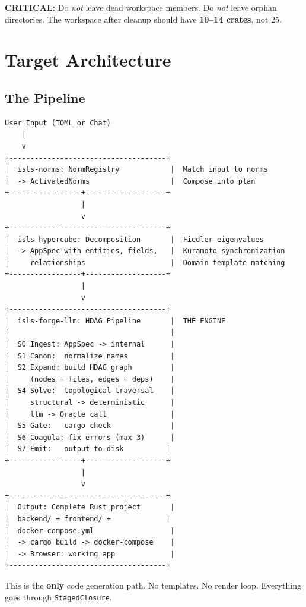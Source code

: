 \documentclass[11pt,a4paper]{article}
\begin{document}
\textbf{CRITICAL:} Do \emph{not} leave dead workspace members. Do \emph{not} leave orphan directories.
The workspace after cleanup should have \textbf{10--14 crates}, not 25.

\section{Target Architecture}

\subsection{The Pipeline}

\begin{lstlisting}[language={}]
User Input (TOML or Chat)
    |
    v
+-------------------------------------+
|  isls-norms: NormRegistry            |  Match input to norms
|  -> ActivatedNorms                   |  Compose into plan
+-----------------+-------------------+
                  |
                  v
+-------------------------------------+
|  isls-hypercube: Decomposition       |  Fiedler eigenvalues
|  -> AppSpec with entities, fields,   |  Kuramoto synchronization
|     relationships                    |  Domain template matching
+-----------------+-------------------+
                  |
                  v
+-------------------------------------+
|  isls-forge-llm: HDAG Pipeline       |  THE ENGINE
|                                      |
|  S0 Ingest: AppSpec -> internal      |
|  S1 Canon:  normalize names          |
|  S2 Expand: build HDAG graph         |
|     (nodes = files, edges = deps)    |
|  S4 Solve:  topological traversal    |
|     structural -> deterministic      |
|     llm -> Oracle call               |
|  S5 Gate:   cargo check              |
|  S6 Coagula: fix errors (max 3)      |
|  S7 Emit:   output to disk          |
+-----------------+-------------------+
                  |
                  v
+-------------------------------------+
|  Output: Complete Rust project       |
|  backend/ + frontend/ +             |
|  docker-compose.yml                  |
|  -> cargo build -> docker-compose    |
|  -> Browser: working app             |
+-------------------------------------+
\end{lstlisting}

This is the \textbf{only} code generation path. No templates. No render loop.
Everything goes through \texttt{StagedClosure}.
\end{document}
